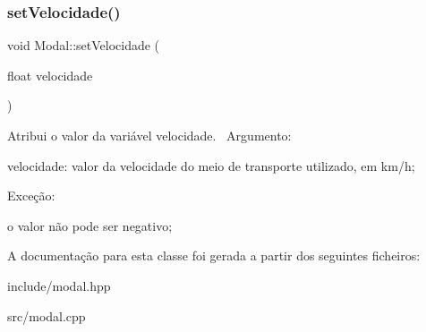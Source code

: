 \subsubsection{\texorpdfstring{set\+Velocidade()}{setVelocidade()}}
{\footnotesize\ttfamily void Modal\+::set\+Velocidade (\begin{DoxyParamCaption}\item[{float}]{velocidade }\end{DoxyParamCaption})}

Atribui o valor da variável velocidade.~\newline
 Argumento\+:
\begin{DoxyItemize}
\item velocidade\+: valor da velocidade do meio de transporte utilizado, em km/h;~\newline

\end{DoxyItemize}

Exceção\+:~\newline

\begin{DoxyItemize}
\item o valor não pode ser negativo;~\newline
 
\end{DoxyItemize}

A documentação para esta classe foi gerada a partir dos seguintes ficheiros\+:\begin{DoxyCompactItemize}
\item 
include/modal.\+hpp\item 
src/modal.\+cpp\end{DoxyCompactItemize}
